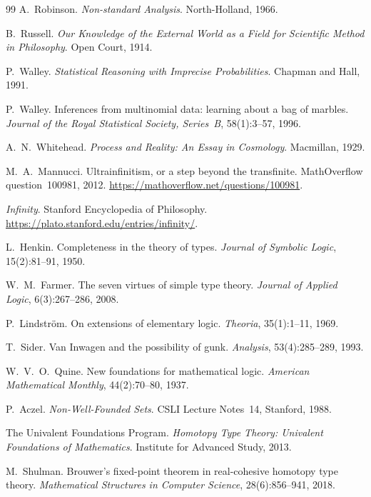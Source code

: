 \documentclass[]{article}
\theoremstyle{definition}
\theoremstyle{remark}
\begin{document}
\begin{thebibliography}{99}
 A.~Robinson. \emph{Non-standard Analysis}. North-Holland,
1966.

 B.~Russell. \emph{Our Knowledge of the External World as a
Field for Scientific Method in Philosophy}. Open Court, 1914.

 P.~Walley. \emph{Statistical Reasoning with Imprecise
Probabilities}. Chapman and Hall, 1991.

 P.~Walley. Inferences from multinomial data:
learning about a bag of marbles. \emph{Journal of the Royal Statistical Society,
Series~B}, 58(1):3--57, 1996.

 A.~N.~Whitehead. \emph{Process and Reality: An Essay in
Cosmology}. Macmillan, 1929.

 M.~A.~Mannucci. Ultrainfinitism, or a step beyond the
transfinite. MathOverflow question~100981, 2012.
\url{https://mathoverflow.net/questions/100981}.

 \emph{Infinity}. Stanford Encyclopedia of Philosophy.
\url{https://plato.stanford.edu/entries/infinity/}.

 L.~Henkin. Completeness in the theory of types.
\emph{Journal of Symbolic Logic}, 15(2):81--91, 1950.

 W.~M.~Farmer. The seven virtues of simple type theory.
\emph{Journal of Applied Logic}, 6(3):267--286, 2008.

 P.~Lindstr\"om. On extensions of elementary logic.
\emph{Theoria}, 35(1):1--11, 1969.

 T.~Sider. Van Inwagen and the possibility of gunk.
\emph{Analysis}, 53(4):285--289, 1993.

 W.~V.~O.~Quine. New foundations for mathematical logic.
\emph{American Mathematical Monthly}, 44(2):70--80, 1937.

 P.~Aczel. \emph{Non-Well-Founded Sets}. CSLI Lecture Notes~14,
Stanford, 1988.

 The Univalent Foundations Program. \emph{Homotopy Type Theory:
Univalent Foundations of Mathematics}. Institute for Advanced Study, 2013.

 M.~Shulman. Brouwer's fixed-point theorem in
real-cohesive homotopy type theory. \emph{Mathematical Structures in Computer
Science}, 28(6):856--941, 2018.


\end{thebibliography}
\end{document}
